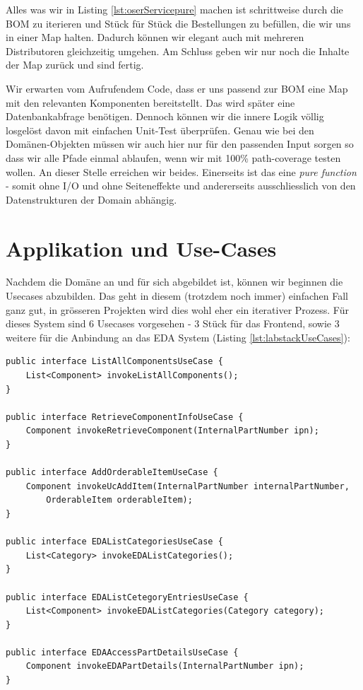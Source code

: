 Alles was wir in Listing \ref{lst:oserServicepure} machen ist schrittweise 
durch die BOM zu iterieren und 
Stück für Stück die Bestellungen zu befüllen, die wir uns in einer Map halten.
Dadurch können wir elegant auch mit mehreren Distributoren gleichzeitig umgehen.
Am Schluss geben wir nur noch die Inhalte der Map zurück und sind fertig.

Wir erwarten vom Aufrufendem Code, dass er uns passend zur BOM eine Map
mit den relevanten Komponenten bereitstellt. Das wird später eine
Datenbankabfrage benötigen. Dennoch können wir die innere Logik völlig losgelöst
davon mit einfachen Unit-Test überprüfen. Genau wie bei den Domänen-Objekten
müssen wir auch hier nur für den passenden Input sorgen so dass wir alle
Pfade einmal ablaufen, wenn wir mit 100\% path-coverage testen wollen. An
dieser Stelle erreichen wir beides. Einerseits ist das eine
\textit{pure function} - somit ohne I/O und ohne Seiteneffekte und andererseits
ausschliesslich von den Datenstrukturen der Domain abhängig.

\section{Applikation und Use-Cases}
Nachdem die Domäne an und für sich abgebildet ist, können wir beginnen
die Usecases abzubilden. Das geht in diesem (trotzdem noch immer)
einfachen Fall ganz gut, in grösseren Projekten wird dies wohl eher
ein iterativer Prozess. Für dieses System sind 6 Usecases vorgesehen - 
3 Stück für das Frontend, sowie 3 weitere für die Anbindung an das EDA
System (Listing \ref{lst:labstackUseCases}):

\begin{listing}[H]
\begin{verbatim}
public interface ListAllComponentsUseCase {
    List<Component> invokeListAllComponents();
}

public interface RetrieveComponentInfoUseCase {
    Component invokeRetrieveComponent(InternalPartNumber ipn);
}

public interface AddOrderableItemUseCase {
    Component invokeUcAddItem(InternalPartNumber internalPartNumber, 
        OrderableItem orderableItem);
}

public interface EDAListCategoriesUseCase {
    List<Category> invokeEDAListCategories();
}

public interface EDAListCetegoryEntriesUseCase {
    List<Component> invokeEDAListCategories(Category category);
}

public interface EDAAccessPartDetailsUseCase {
    Component invokeEDAPartDetails(InternalPartNumber ipn);
}
\end{verbatim}
\caption{6 Usecases als Interfaces modelliert (\textit{Driven Ports})}
\label{lst:labstackUseCases}
\end{listing}

